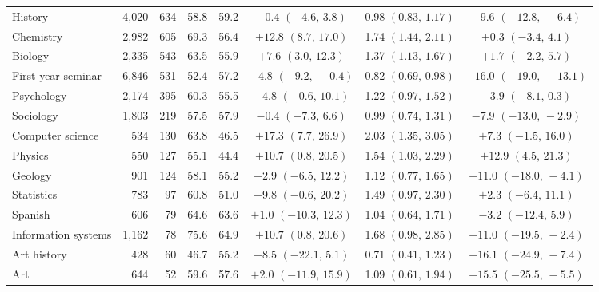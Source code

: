 \begin{table}[tbp]
{\begin{tabular}{@{}lrrrrccc@{}}
History & 4,020 & 634 & 58.8 & 59.2 & $-0.4$ $(-4.6,\,3.8)$ & 0.98 $(0.83,\,1.17)$ & $-9.6$ $(-12.8,\,-6.4)$ \\
Chemistry & 2,982 & 605 & 69.3 & 56.4 & $+12.8$ $(8.7,\,17.0)$ & 1.74 $(1.44,\,2.11)$ & $+0.3$ $(-3.4,\,4.1)$ \\
Biology & 2,335 & 543 & 63.5 & 55.9 & $+7.6$ $(3.0,\,12.3)$ & 1.37 $(1.13,\,1.67)$ & $+1.7$ $(-2.2,\,5.7)$ \\
First-year seminar & 6,846 & 531 & 52.4 & 57.2 & $-4.8$ $(-9.2,\,-0.4)$ & 0.82 $(0.69,\,0.98)$ & $-16.0$ $(-19.0,\,-13.1)$ \\
Psychology & 2,174 & 395 & 60.3 & 55.5 & $+4.8$ $(-0.6,\,10.1)$ & 1.22 $(0.97,\,1.52)$ & $-3.9$ $(-8.1,\,0.3)$ \\
Sociology & 1,803 & 219 & 57.5 & 57.9 & $-0.4$ $(-7.3,\,6.6)$ & 0.99 $(0.74,\,1.31)$ & $-7.9$ $(-13.0,\,-2.9)$ \\
Computer science & 534 & 130 & 63.8 & 46.5 & $+17.3$ $(7.7,\,26.9)$ & 2.03 $(1.35,\,3.05)$ & $+7.3$ $(-1.5,\,16.0)$ \\
Physics & 550 & 127 & 55.1 & 44.4 & $+10.7$ $(0.8,\,20.5)$ & 1.54 $(1.03,\,2.29)$ & $+12.9$ $(4.5,\,21.3)$ \\
Geology & 901 & 124 & 58.1 & 55.2 & $+2.9$ $(-6.5,\,12.2)$ & 1.12 $(0.77,\,1.65)$ & $-11.0$ $(-18.0,\,-4.1)$ \\
Statistics & 783 & 97 & 60.8 & 51.0 & $+9.8$ $(-0.6,\,20.2)$ & 1.49 $(0.97,\,2.30)$ & $+2.3$ $(-6.4,\,11.1)$ \\
Spanish & 606 & 79 & 64.6 & 63.6 & $+1.0$ $(-10.3,\,12.3)$ & 1.04 $(0.64,\,1.71)$ & $-3.2$ $(-12.4,\,5.9)$ \\
Information systems & 1,162 & 78 & 75.6 & 64.9 & $+10.7$ $(0.8,\,20.6)$ & 1.68 $(0.98,\,2.85)$ & $-11.0$ $(-19.5,\,-2.4)$ \\
Art history & 428 & 60 & 46.7 & 55.2 & $-8.5$ $(-22.1,\,5.1)$ & 0.71 $(0.41,\,1.23)$ & $-16.1$ $(-24.9,\,-7.4)$ \\
Art & 644 & 52 & 59.6 & 57.6 & $+2.0$ $(-11.9,\,15.9)$ & 1.09 $(0.61,\,1.94)$ & $-15.5$ $(-25.5,\,-5.5)$ \\
\bottomrule
\end{tabular}}
\end{table}
